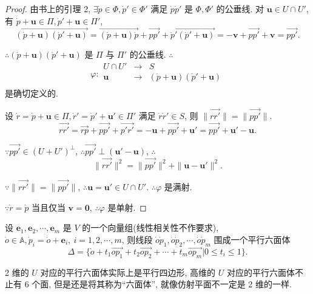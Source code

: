 \documentclass{ctexart}
\begin{document}
\begin{proof}
    由书上的引理 2, $\exists\dot{p}\in\varPhi,\dot{p}'\in\varPhi'$ 满足 $\dot{p}\dot{p}'$ 是 $\varPhi,\varPhi'$ 的公垂线. 对 $\boldsymbol{u}\in U\cap U'$, 有 $\dot{p}+\boldsymbol{u}\in\varPi,\dot{p}'+\boldsymbol{u}\in\varPi'$,
    \[\overrightarrow{(\dot{p}+\boldsymbol{u})(\dot{p}'+\boldsymbol{u})}=\overrightarrow{(\dot{p}+\boldsymbol{u})\dot{p}}+\overrightarrow{pp'}+\overrightarrow{\dot{p}'(\dot{p}'+\boldsymbol{u})}=-\boldsymbol{v}+\overrightarrow{pp'}+\boldsymbol{v}=\overrightarrow{pp'}.\]

    $\therefore(\dot{p}+\boldsymbol{u})(\dot{p}'+\boldsymbol{u})$ 是 $\varPi$ 与 $\varPi'$ 的公垂线. $\therefore$
    \[\varphi:\begin{array}{rcl}
        U\cap U' & \to & S \\
        \boldsymbol{u} & \to & (\dot{p}+\boldsymbol{u})(\dot{p}'+\boldsymbol{u}) \\
    \end{array}\]
    是确切定义的.

    设 $\dot{r}=\dot{p}+\boldsymbol{u}\in\varPi,\dot{r}'=\dot{p}'+\boldsymbol{u}'\in\varPi'$ 满足 $\dot{r}\dot{r}'\in S$, 则 $\|\overrightarrow{rr'}\|=\|\overrightarrow{pp'}\|$.
    \[\overrightarrow{rr'}=\overrightarrow{rp}+\overrightarrow{pp'}+\overrightarrow{p'r'}=-\boldsymbol{u}+\overrightarrow{pp'}+\boldsymbol{u}'=\overrightarrow{pp'}+\boldsymbol{u}'-\boldsymbol{u}.\]

    $\because\overrightarrow{pp'}\in(U+U')^\perp$, $\therefore\overrightarrow{pp'}\perp(\boldsymbol{u}'-\boldsymbol{u})$, $\therefore$
    \[\|\overrightarrow{rr'}\|^2=\|\overrightarrow{pp'}\|^2+\|\boldsymbol{u}-\boldsymbol{u}'\|^2.\]

    $\because\|\overrightarrow{rr'}\|=\|\overrightarrow{pp'}\|$, $\therefore\boldsymbol{u}=\boldsymbol{u}'\in U\cap U'$. $\therefore\varphi$ 是满射.

    $\because\dot{r}=\dot{p}$ 当且仅当 $\boldsymbol{v}=\boldsymbol{0}$, $\therefore\varphi$ 是单射.
\end{proof}
设 $\boldsymbol{e}_1,\boldsymbol{e}_2,\cdots,\boldsymbol{e}_m$ 是 $V$ 的一个向量组(线性相关性不作要求), $\dot{o}\in\mathbb{A},\dot{p}_i=\dot{o}+\boldsymbol{e}_i,\ i=1,2,\cdots,m$, 则线段 $\dot{o}\dot{p}_1,\dot{o}\dot{p}_2,\cdots,\dot{o}\dot{p}_m$ 围成一个平行六面体
\[\Delta=\{\dot{o}+t_1\overrightarrow{op_1}+t_2\overrightarrow{op_2}+\cdots+t_m\overrightarrow{op_m}|0\leq t_i\leq1\}.\]

2 维的 $U$ 对应的平行六面体实际上是平行四边形, 高维的 $U$ 对应的平行六面体不止有 6 个面, 但是还是将其称为``六面体'', 就像仿射平面不一定是 2 维的一样.
\end{document}
